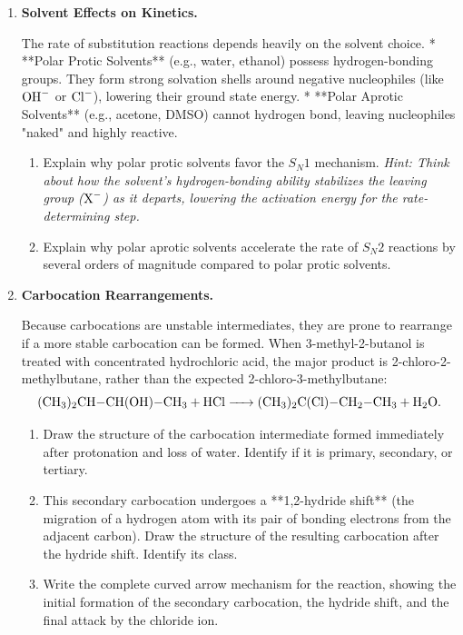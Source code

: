 \documentclass[12pt, a4paper]{book}
\begin{document}
\begin{deepbox}
\begin{enumerate}[label=\textbf{D\arabic*.}]
  \item \textbf{Solvent Effects on Kinetics.}
  
        The rate of substitution reactions depends heavily on the solvent choice.
        * **Polar Protic Solvents** (e.g., water, ethanol) possess hydrogen-bonding groups. They form strong solvation shells around negative nucleophiles (like $\ce{OH-}$ or $\ce{Cl-}$), lowering their ground state energy.
        * **Polar Aprotic Solvents** (e.g., acetone, DMSO) cannot hydrogen bond, leaving nucleophiles "naked" and highly reactive.
        
        \begin{enumerate}[label=(\alph*)]
          \item Explain why polar protic solvents favor the $S_N1$ mechanism. \textit{Hint: Think about how the solvent's hydrogen-bonding ability stabilizes the leaving group ($\ce{X-}$) as it departs, lowering the activation energy for the rate-determining step.}
          \item Explain why polar aprotic solvents accelerate the rate of $S_N2$ reactions by several orders of magnitude compared to polar protic solvents.
        \end{enumerate}

  \item \textbf{Carbocation Rearrangements.}
  
        Because carbocations are unstable intermediates, they are prone to rearrange if a more stable carbocation can be formed.
        When 3-methyl-2-butanol is treated with concentrated hydrochloric acid, the major product is 2-chloro-2-methylbutane, rather than the expected 2-chloro-3-methylbutane:
        \[
          \ce{(CH3)2CH-CH(OH)-CH3 + HCl -> (CH3)2C(Cl)-CH2-CH3 + H2O}.
        \]
        \begin{enumerate}[label=(\alph*)]
          \item Draw the structure of the carbocation intermediate formed immediately after protonation and loss of water. Identify if it is primary, secondary, or tertiary.
          \item This secondary carbocation undergoes a **1,2-hydride shift** (the migration of a hydrogen atom with its pair of bonding electrons from the adjacent carbon).
                Draw the structure of the resulting carbocation after the hydride shift. Identify its class.
          \item Write the complete curved arrow mechanism for the reaction, showing the initial formation of the secondary carbocation, the hydride shift, and the final attack by the chloride ion.
        \end{enumerate}
\end{enumerate}
\end{deepbox}
\end{document}
